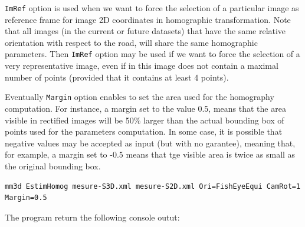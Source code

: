 \noindent \texttt{ImRef} option is used when we want to force the selection of a particular image as reference frame for image 2D coordinates in homographic transformation. Note that all images (in the current or future datasets) that have the same relative orientation with respect to the road, will share the same homographic parameters. Then \texttt{ImRef} option may be used if we want to force the selection of a very representative image, even if in this image does not contain a maximal number of points (provided that it contains at least 4 points). \newline

\noindent Eventually \texttt{Margin} option enables to set the area used for the homography computation. For instance, a margin set to the value 0.5, means that the area visible in rectified images will be 50\% larger than the actual bounding box of points used for the parameters computation. In some case, it is possible that negative values may be accepted as input (but with no garantee), meaning that, for example, a margin set to -0.5 means that tge visible area is twice as small as the original bounding box. \newline

\begin{verbatim}
mm3d EstimHomog mesure-S3D.xml mesure-S2D.xml Ori=FishEyeEqui CamRot=1 Margin=0.5
\end{verbatim}

\noindent The program return the following console outut: \newline

